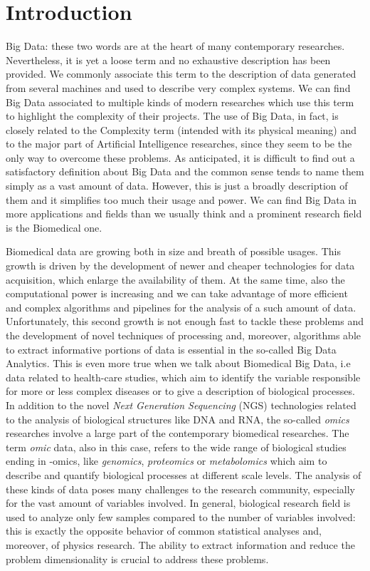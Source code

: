 \documentclass{standalone}
\begin{document}
\chapter*{Introduction}\label{Introduction}

Big Data: these two words are at the heart of many contemporary researches.
Nevertheless, it is yet a loose term and no exhaustive description has been provided.
We commonly associate this term to the description of data generated from several machines and used to describe very complex systems.
We can find Big Data associated to multiple kinds of modern researches which use this term to highlight the complexity of their projects.
The use of Big Data, in fact, is closely related to the Complexity term (intended with its physical meaning) and to the major part of Artificial Intelligence researches, since they seem to be the only way to overcome these problems.
As anticipated, it is difficult to find out a satisfactory definition about Big Data and the common sense tends to name them simply as a vast amount of data.
However, this is just a broadly description of them and it simplifies too much their usage and power.
We can find Big Data in more applications and fields than we usually think and a prominent research field is the Biomedical one.

Biomedical data are growing both in size and breath of possible usages.
This growth is driven by the development of newer and cheaper technologies for data acquisition, which enlarge the availability of them.
At the same time, also the computational power is increasing and we can take advantage of more efficient and complex algorithms and pipelines for the analysis of a such amount of data.
Unfortunately, this second growth is not enough fast to tackle these problems and the development of novel techniques of processing and, moreover, algorithms able to extract informative portions of data is essential in the so-called Big Data Analytics.
This is even more true when we talk about Biomedical Big Data, i.e data related to health-care studies, which aim to identify the variable responsible for more or less complex diseases or to give a description of biological processes.
In addition to the novel \emph{Next Generation Sequencing} (NGS) technologies related to the analysis of biological structures like DNA and RNA, the so-called \emph{omics} researches involve a large part of the contemporary biomedical researches.
The term \emph{omic} data, also in this case, refers to the wide range of biological studies ending in -omics, like \emph{genomics}, \emph{proteomics} or \emph{metabolomics} which aim to describe and quantify biological processes at different scale levels.
The analysis of these kinds of data poses many challenges to the research community, especially for the vast amount of variables involved.
In general, biological research field is used to analyze only few samples compared to the number of variables involved: this is exactly the opposite behavior of common statistical analyses and, moreover, of physics research.
The ability to extract information and reduce the problem dimensionality is crucial to address these problems.
\end{document}
